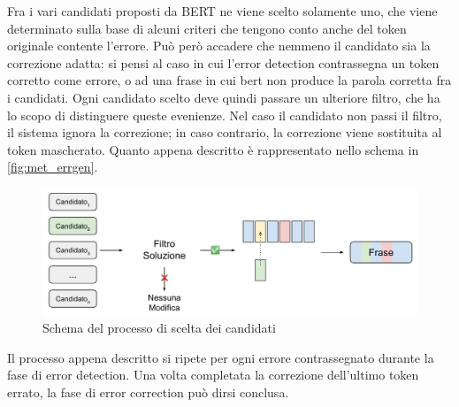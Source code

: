 Fra i vari candidati proposti da BERT ne viene scelto solamente uno, che viene determinato sulla base di alcuni criteri che tengono conto anche del token originale contente l'errore. Può però accadere che nemmeno il candidato sia la correzione adatta: si pensi al caso in cui l'error detection contrassegna un token corretto come errore, o ad una frase in cui bert non produce la parola corretta fra i candidati. Ogni candidato scelto deve quindi passare un ulteriore filtro, che ha lo scopo di distinguere queste evenienze. Nel caso il candidato non passi il filtro, il sistema ignora la correzione; in caso contrario, la correzione viene sostituita al token mascherato. Quanto appena descritto è rappresentato nello schema in \autoref{fig:met_errgen}.
\begin{figure}[H]
\centering
\includegraphics[width=\textwidth]{immagini/metodologia/scelta_candidati}
\caption{Schema del processo di scelta dei candidati}
\label{fig:met_errgen}
\end{figure}
Il processo appena descritto si ripete per ogni errore contrassegnato durante la fase di error detection. Una volta completata la correzione dell'ultimo token errato, la fase di error correction può dirsi conclusa.




